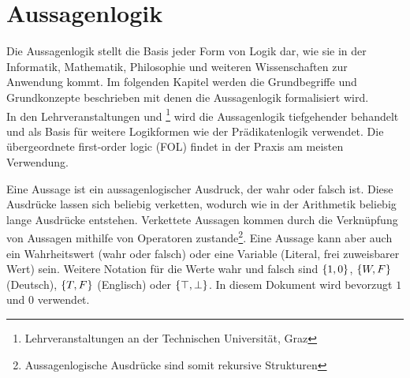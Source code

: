 \chapter{Aussagenlogik}
\label{sec:propositional_logic}
\newcommand{\BOOL}{\text{BOOL}}
\newcommand{\T}{1}
\newcommand{\F}{0}
\newcommand{\f}{f_\arabic{bfunc}}
%
%
Die Aussagenlogik stellt die Basis jeder Form von Logik dar, wie sie in der Informatik, Mathematik, Philosophie und weiteren Wissenschaften zur Anwendung kommt. Im folgenden Kapitel werden die Grundbegriffe und Grundkonzepte beschrieben mit denen die Aussagenlogik formalisiert wird. \\
In den Lehrveranstaltungen \coursedm{} und \courselc{}\footnote{Lehrveranstaltungen an der Technischen Universität, Graz} wird die Aussagenlogik tiefgehender behandelt und als Basis für weitere Logikformen wie der Prädikatenlogik verwendet. Die übergeordnete first-order logic (FOL) findet in der Praxis am meisten Verwendung.

Eine Aussage ist ein aussagenlogischer Ausdruck, der wahr oder falsch ist. Diese Ausdrücke lassen sich beliebig verketten, wodurch wie in der Arithmetik beliebig lange Ausdrücke entstehen. Verkettete Aussagen kommen durch die Verknüpfung von Aussagen mithilfe von Operatoren zustande\footnote{Aussagenlogische Ausdrücke sind somit rekursive Strukturen}. Eine Aussage kann aber auch ein Wahrheitswert (wahr oder falsch) oder eine Variable (Literal, frei zuweisbarer Wert) sein. Weitere Notation für die Werte wahr und falsch sind $\left\{1, 0\right\}$, $\left\{W, F\right\}$ (Deutsch), $\left\{T, F\right\}$ (Englisch) oder $\left\{\top, \bot\right\}$. In diesem Dokument wird bevorzugt $\T$ und $\F$ verwendet.

